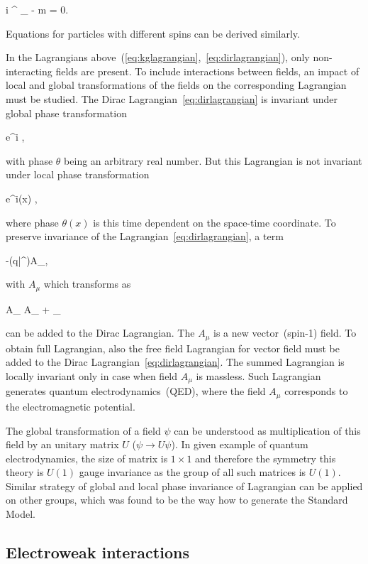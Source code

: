 {
  i \gamma^{\mu} \partial_{\mu} \psi - m \psi = 0.
}

Equations for particles with different spins can be derived similarly.

In the Lagrangians above~(\ref{eq:kglagrangian},~\ref{eq:dirlagrangian}), only non-interacting fields are present. To include interactions between fields, an impact of local and global transformations of the fields on the corresponding Lagrangian must be studied. The Dirac Lagrangian~\ref{eq:dirlagrangian} is invariant under global phase transformation

{
\psi \to e^{i\theta} \psi, 
}

with phase $\theta$ being an arbitrary real number. But this Lagrangian is not invariant under local phase transformation 

{
\psi \to e^{i\theta (x)} \psi,
}

where phase $\theta(x)$ is this time dependent on the space-time coordinate. To preserve invariance of the Lagrangian~\ref{eq:dirlagrangian}, a term 

{
-(q\bar{\psi}\gamma^{\mu}\psi)A_{\mu}, 
}

with $A_{\mu}$ which transforms as 

{
A_{\mu} \to A_{\mu} + \partial_{\mu} \lambda
}

can be added to the Dirac Lagrangian. The $A_{\mu}$ is a new vector~(spin-1) field. To obtain full Lagrangian, also the free field Lagrangian for vector field must be added to the Dirac Lagrangian~\ref{eq:dirlagrangian}. The summed Lagrangian is locally invariant only in case when field $A_{\mu}$ is massless. Such Lagrangian generates quantum electrodynamics~(QED), where the field $A_{\mu}$ corresponds to the electromagnetic potential.

The global transformation of a field $\psi$ can be understood as multiplication of this field by an unitary matrix $U$ ($\psi \to U \psi$). In given example of quantum electrodynamics, the size of matrix is $1 \times 1$ and therefore the symmetry this theory is $U(1)$ gauge invariance as the group of all such matrices is $U(1)$. Similar strategy of global and local phase invariance of Lagrangian can be applied on other groups, which was found to be the way how to generate the Standard Model.

\subsection{Electroweak interactions}


